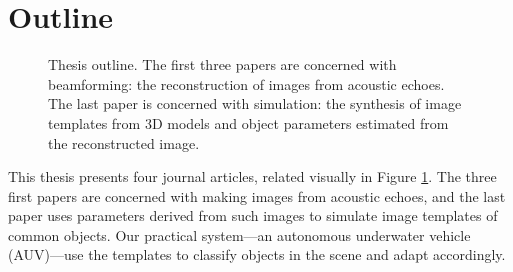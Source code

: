%
%
%


\section{Outline}

\begin{figure}[tp]
\caption{Thesis outline. The first three papers are concerned with beamforming: the reconstruction of images from acoustic echoes. The last paper is concerned with simulation: the synthesis of image templates from 3D models and object parameters estimated from the reconstructed image. %
}\label{fig_outline_simple}
\end{figure}

This thesis presents four journal articles, related visually in Figure \ref{fig_outline_simple}. The three first papers are concerned with making images from acoustic echoes, and the last paper uses parameters derived from such images to simulate image templates of common objects. Our practical system---an autonomous underwater vehicle (AUV)---use the templates to classify objects in the scene and adapt accordingly. 

